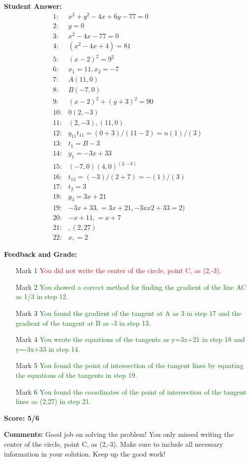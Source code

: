\documentclass{article}
\begin{document}
\textbf{Student Answer:}
\begin{align*}
1: & x^{2}+y^{2}-4x+6y-77=0 \\
2: & y=0 \\
3: & x^{2}-4x-77=0 \\
4: & (x^{2}-4x+4)=81 \\
5: & (x-2)^{2}=9^{2} \\
6: & x_1=11, x_2=-7 \\
7: & A(11, 0) \\
8: & B(-7, 0) \\
9: & (x-2)^{2}+(y+3)^{2}=90 \\
10: & 0(2,-3) \\
11: & (2,-3),(11,0) \\
12: & q_{11}t_{11}=(0+3)/(11-2)=n(1)/(3) \\
13: & t_1=B-3 \\
14: & y_1=-3x+33 \\
15: & (-7,0)(4,0)^{(2,-3)} \\
16: & t_{12}= (-3)/(2+7)=-(1)/(3) \\
17: & t_2=3 \\
18: & y_3=3x+21 \\
19: & -3x+33,=3x+21,-3xx2+33=2) \\
20: & -x+11,=x+7 \\
21: & ,(2, 27) \\
22: & x,=2
\end{align*}

\textbf{Feedback and Grade:}
\begin{itemize}
\item[Mark 1] \textcolor{red}{You did not write the center of the circle, point C, as (2,-3).}
\item[Mark 2] \textcolor{green}{You showed a correct method for finding the gradient of the line AC as 1/3 in step 12.}
\item[Mark 3] \textcolor{green}{You found the gradient of the tangent at A as 3 in step 17 and the gradient of the tangent at B as -3 in step 13.}
\item[Mark 4] \textcolor{green}{You wrote the equations of the tangents as y=3x+21 in step 18 and y=-3x+33 in step 14.}
\item[Mark 5] \textcolor{green}{You found the point of intersection of the tangent lines by equating the equations of the tangents in step 19.}
\item[Mark 6] \textcolor{green}{You found the coordinates of the point of intersection of the tangent lines as (2,27) in step 21.}
\end{itemize}

\textbf{Score: 5/6}

\textbf{Comments:} Good job on solving the problem! You only missed writing the center of the circle, point C, as (2,-3). Make sure to include all necessary information in your solution. Keep up the good work!
\end{document}
